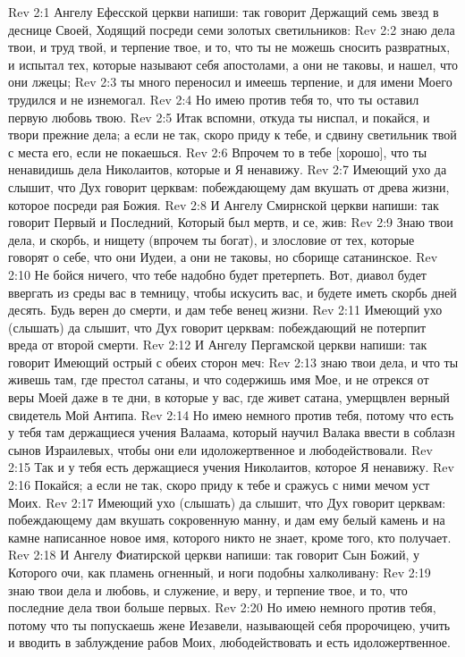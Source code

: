 Rev 2:1  Ангелу Ефесской церкви напиши: так говорит Держащий семь звезд в деснице Своей, Ходящий посреди семи золотых светильников:
Rev 2:2  знаю дела твои, и труд твой, и терпение твое, и то, что ты не можешь сносить развратных, и испытал тех, которые называют себя апостолами, а они не таковы, и нашел, что они лжецы;
Rev 2:3  ты много переносил и имеешь терпение, и для имени Моего трудился и не изнемогал.
Rev 2:4  Но имею против тебя то, что ты оставил первую любовь твою.
Rev 2:5  Итак вспомни, откуда ты ниспал, и покайся, и твори прежние дела; а если не так, скоро приду к тебе, и сдвину светильник твой с места его, если не покаешься.
Rev 2:6  Впрочем то в тебе [хорошо], что ты ненавидишь дела Николаитов, которые и Я ненавижу.
Rev 2:7  Имеющий ухо да слышит, что Дух говорит церквам: побеждающему дам вкушать от древа жизни, которое посреди рая Божия.
Rev 2:8  И Ангелу Смирнской церкви напиши: так говорит Первый и Последний, Который был мертв, и се, жив:
Rev 2:9  Знаю твои дела, и скорбь, и нищету (впрочем ты богат), и злословие от тех, которые говорят о себе, что они Иудеи, а они не таковы, но сборище сатанинское.
Rev 2:10  Не бойся ничего, что тебе надобно будет претерпеть. Вот, диавол будет ввергать из среды вас в темницу, чтобы искусить вас, и будете иметь скорбь дней десять. Будь верен до смерти, и дам тебе венец жизни.
Rev 2:11  Имеющий ухо (слышать) да слышит, что Дух говорит церквам: побеждающий не потерпит вреда от второй смерти.
Rev 2:12  И Ангелу Пергамской церкви напиши: так говорит Имеющий острый с обеих сторон меч:
Rev 2:13  знаю твои дела, и что ты живешь там, где престол сатаны, и что содержишь имя Мое, и не отрекся от веры Моей даже в те дни, в которые у вас, где живет сатана, умерщвлен верный свидетель Мой Антипа.
Rev 2:14  Но имею немного против тебя, потому что есть у тебя там держащиеся учения Валаама, который научил Валака ввести в соблазн сынов Израилевых, чтобы они ели идоложертвенное и любодействовали.
Rev 2:15  Так и у тебя есть держащиеся учения Николаитов, которое Я ненавижу.
Rev 2:16  Покайся; а если не так, скоро приду к тебе и сражусь с ними мечом уст Моих.
Rev 2:17  Имеющий ухо (слышать) да слышит, что Дух говорит церквам: побеждающему дам вкушать сокровенную манну, и дам ему белый камень и на камне написанное новое имя, которого никто не знает, кроме того, кто получает.
Rev 2:18  И Ангелу Фиатирской церкви напиши: так говорит Сын Божий, у Которого очи, как пламень огненный, и ноги подобны халколивану:
Rev 2:19  знаю твои дела и любовь, и служение, и веру, и терпение твое, и то, что последние дела твои больше первых.
Rev 2:20  Но имею немного против тебя, потому что ты попускаешь жене Иезавели, называющей себя пророчицею, учить и вводить в заблуждение рабов Моих, любодействовать и есть идоложертвенное.
